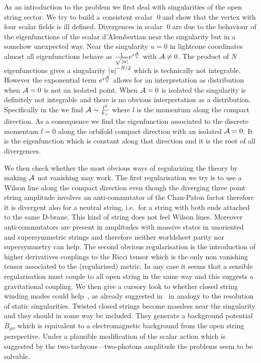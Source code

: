 As an introduction to the problem we first deal with singularities of the open string sector.
We try to build a consistent scalar \qed and show that the vertex with four scalar fields is ill defined.
Divergences in scalar \qed are due to the behaviour of the eigenfunctions of the scalar d'Alembertian near the singularity but in a somehow unexpected way.
Near the singularity $u = 0$ in lightcone coordinates almost all eigenfunctions behave as $\frac{1}{\sqrt{\abs{u}}} e^{i \frac{\mathcal{A}}{u}}$ with $\mathcal{A} \neq 0$.
The product of $N$ eigenfunctions gives a singularity $\abs{u}^{-N/2}$ which is technically not integrable.
However the exponential term $e^{i \frac{\mathcal{A}}{u}}$ allows for an interpretation as distribution when $\mathcal{A} = 0$ is not an isolated point.
When $\mathcal{A} = 0$ is isolated the singularity is definitely not integrable and there is no obvious interpretation as a distribution.
Specifically in the \nbo we find $\mathcal{A} \sim \frac{l^2}{k_+}$ where $l$ is the momentum along the compact direction.
As a consequence we find the eigenfunction associated to the discrete momentum $l = 0$ along the orbifold compact direction with an isolated $\mathcal{A} = 0$.
It is the eigenfunction which is constant along that direction and it is the root of all divergences.

We then check whether the most obvious ways of regularizing the theory by making $\mathcal{A}$ not vanishing may work.
The first regularisation we try is to use a Wilson line along the compact direction even though the diverging three point string amplitude involves an anti-commutator of the Chan-Paton factor therefore it is divergent also for a neutral string, i.e.\ for a string with both ends attached to the same D-brane.
This kind of string does not feel Wilson lines.
Moreover anti-commutators are present in amplitudes with massive states in unoriented and supersymmetric strings and therefore neither worldsheet parity nor supersymmetry can help.
The second obvious regularisation is the introduction of higher derivatives couplings to the Ricci tensor which is the only non vanishing tensor associated to the (regularised) metric.
In any case it seems that a sensible regularisation must couple to all open string in the same way and this suggests a gravitational coupling.
We then give a cursory look to whether closed string winding modes could help~\cite{Berkooz:2003:StringsElectricField}, as already suggested in~\cite{Liu:2002:StringsTimeDependentOrbifolds,Craps:2002:StringPropagationPresence} in analogy to the resolution of static singularities.
Twisted closed strings become massless near the singularity and they should in some way be included.
They generate a background potential $B_{\mu\nu}$ which is equivalent to a electromagnetic background from the open string perspective. 
Under a plausible modification of the scalar action which is suggested by the two-tachyons---two-photons amplitude the problems seem to be solvable.

